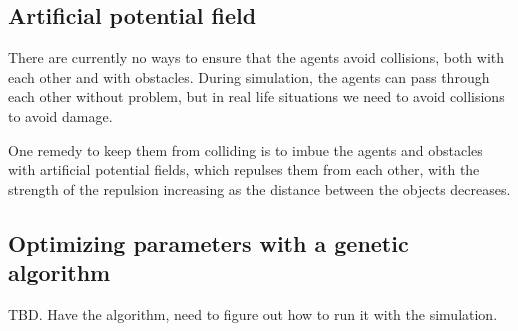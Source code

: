 \subsection{Artificial potential field}
There are currently no ways to ensure that the agents avoid collisions, both with each other and with obstacles. During simulation, the agents can pass through each other without problem, but in real life situations we need to avoid collisions to avoid damage. 

One remedy to keep them from colliding is to imbue the agents and obstacles with artificial potential fields, which repulses them from each other, with the strength of the repulsion increasing as the distance between the objects decreases. 





\subsection{Optimizing parameters with a genetic algorithm} 
TBD. Have the algorithm, need to figure out how to run it with the simulation. 
